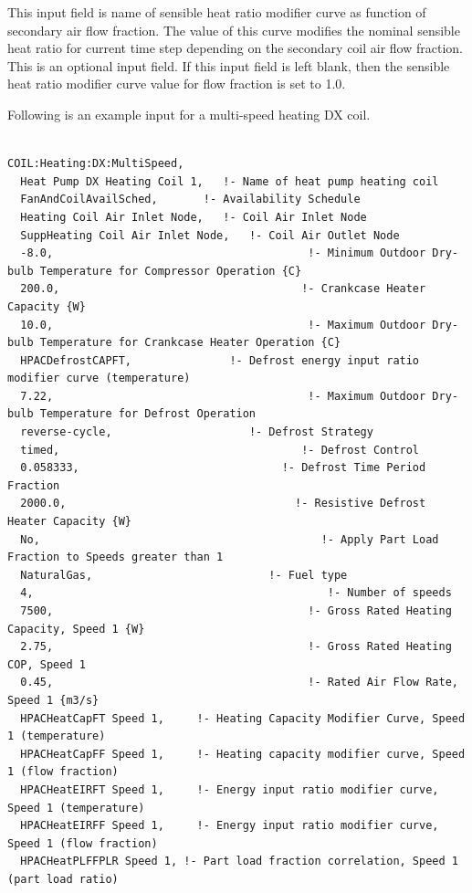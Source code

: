 This input field is name of sensible heat ratio modifier curve as function of secondary air flow fraction. The value of this curve modifies the nominal sensible heat ratio for current time step depending on the secondary coil air flow fraction. This is an optional input field. If this input field is left blank, then the sensible heat ratio modifier curve value for flow fraction is set to 1.0.

Following is an example input for a multi-speed heating DX coil.

\begin{lstlisting}

COIL:Heating:DX:MultiSpeed,
  Heat Pump DX Heating Coil 1,   !- Name of heat pump heating coil
  FanAndCoilAvailSched,       !- Availability Schedule
  Heating Coil Air Inlet Node,   !- Coil Air Inlet Node
  SuppHeating Coil Air Inlet Node,   !- Coil Air Outlet Node
  -8.0,                                       !- Minimum Outdoor Dry-bulb Temperature for Compressor Operation {C}
  200.0,                                     !- Crankcase Heater Capacity {W}
  10.0,                                       !- Maximum Outdoor Dry-bulb Temperature for Crankcase Heater Operation {C}
  HPACDefrostCAPFT,               !- Defrost energy input ratio modifier curve (temperature)
  7.22,                                       !- Maximum Outdoor Dry-bulb Temperature for Defrost Operation
  reverse-cycle,                     !- Defrost Strategy
  timed,                                     !- Defrost Control
  0.058333,                               !- Defrost Time Period Fraction
  2000.0,                                   !- Resistive Defrost Heater Capacity {W}
  No,                                           !- Apply Part Load Fraction to Speeds greater than 1
  NaturalGas,                           !- Fuel type
  4,                                             !- Number of speeds
  7500,                                       !- Gross Rated Heating Capacity, Speed 1 {W}
  2.75,                                       !- Gross Rated Heating COP, Speed 1
  0.45,                                       !- Rated Air Flow Rate, Speed 1 {m3/s}
  HPACHeatCapFT Speed 1,     !- Heating Capacity Modifier Curve, Speed 1 (temperature)
  HPACHeatCapFF Speed 1,     !- Heating capacity modifier curve, Speed 1 (flow fraction)
  HPACHeatEIRFT Speed 1,     !- Energy input ratio modifier curve, Speed 1 (temperature)
  HPACHeatEIRFF Speed 1,     !- Energy input ratio modifier curve, Speed 1 (flow fraction)
  HPACHeatPLFFPLR Speed 1, !- Part load fraction correlation, Speed 1 (part load ratio)

\end{lstlisting}
